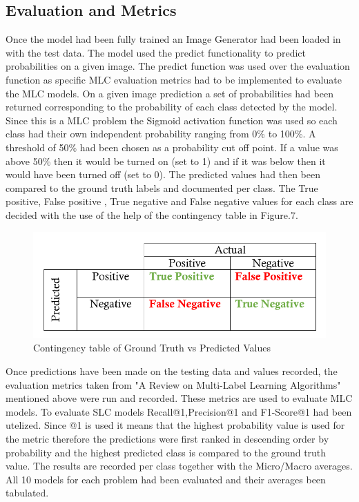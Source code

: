 \documentclass{csfyp}
\begin{document}
\subsection{Evaluation and Metrics}
Once the model had been fully trained an Image Generator had been loaded in with the test data. The model used the predict functionality to predict probabilities on a given image. The predict function was used over the evaluation function as specific MLC evaluation metrics had to be implemented to evaluate the MLC models. On a given image prediction a set of probabilities had been returned corresponding to the probability of each class detected by the model. Since this is a MLC problem the Sigmoid activation function was used so each class had their own independent probability ranging from 0\% to 100\%. A threshold of 50\% had been chosen as a probability cut off point. If a value was above 50\% then it would be turned on (set to 1) and if it was below then it would have been turned off (set to 0). The predicted values had then been compared to the ground truth labels and documented per class. The True positive, False positive , True negative and False negative values for each class are decided with the use of the help of the contingency table in Figure.7.

\begin{figure}[!htbp]
\centering
\includegraphics[scale=0.35]{TPFP.pdf}
\caption{Contingency table of Ground Truth vs Predicted Values }
\end{figure}

Once predictions have been made on the testing data and values recorded, the evaluation metrics taken from "A Review on Multi-Label Learning Algorithms"~\cite{6471714} mentioned above were run and recorded. These metrics are used to evaluate MLC models. To evaluate SLC models Recall@1,Precision@1 and F1-Score@1 had been utelized. Since @1 is used it means that the highest probability value is used for the metric therefore the predictions were first ranked in descending order by probability and the highest predicted class is compared to the ground truth value. The results are recorded per class together with the Micro/Macro averages. All 10 models for each problem had been evaluated and their averages been tabulated.
\end{document}
